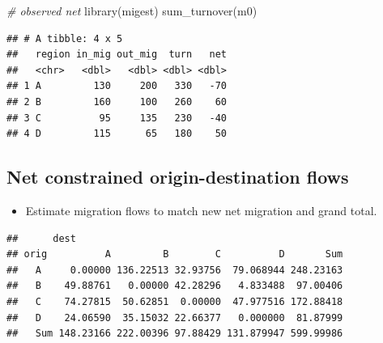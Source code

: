 \documentclass[
]{book}
\newenvironment{Shaded}{\begin{snugshade}}{\end{snugshade}}
\newcommand{\AttributeTok}[1]{\textcolor[rgb]{0.77,0.63,0.00}{#1}}
\newcommand{\CommentTok}[1]{\textcolor[rgb]{0.56,0.35,0.01}{\textit{#1}}}
\newcommand{\ConstantTok}[1]{\textcolor[rgb]{0.00,0.00,0.00}{#1}}
\newcommand{\DecValTok}[1]{\textcolor[rgb]{0.00,0.00,0.81}{#1}}
\newcommand{\FunctionTok}[1]{\textcolor[rgb]{0.00,0.00,0.00}{#1}}
\newcommand{\NormalTok}[1]{#1}
\newcommand{\OtherTok}[1]{\textcolor[rgb]{0.56,0.35,0.01}{#1}}
\newcommand{\SpecialCharTok}[1]{\textcolor[rgb]{0.00,0.00,0.00}{#1}}
\providecommand{\tightlist}{%
  \setlength{\itemsep}{0pt}\setlength{\parskip}{0pt}}
\begin{document}
\begin{Shaded}
\begin{Highlighting}[]
\CommentTok{\# observed net}
\FunctionTok{library}\NormalTok{(migest)}
\FunctionTok{sum\_turnover}\NormalTok{(m0)}
\end{Highlighting}
\end{Shaded}

\begin{verbatim}
## # A tibble: 4 x 5
##   region in_mig out_mig  turn   net
##   <chr>   <dbl>   <dbl> <dbl> <dbl>
## 1 A         130     200   330   -70
## 2 B         160     100   260    60
## 3 C          95     135   230   -40
## 4 D         115      65   180    50
\end{verbatim}

\hypertarget{net-constrained-origin-destination-flows-2}{%
\subsection{Net constrained origin-destination flows}\label{net-constrained-origin-destination-flows-2}}

\begin{itemize}
\tightlist
\item
  Estimate migration flows to match new net migration and grand total.
\end{itemize}

\begin{Shaded}
\end{Shaded}

\begin{verbatim}
##      dest
## orig          A         B        C          D       Sum
##   A     0.00000 136.22513 32.93756  79.068944 248.23163
##   B    49.88761   0.00000 42.28296   4.833488  97.00406
##   C    74.27815  50.62851  0.00000  47.977516 172.88418
##   D    24.06590  35.15032 22.66377   0.000000  81.87999
##   Sum 148.23166 222.00396 97.88429 131.879947 599.99986
\end{verbatim}
\end{document}
